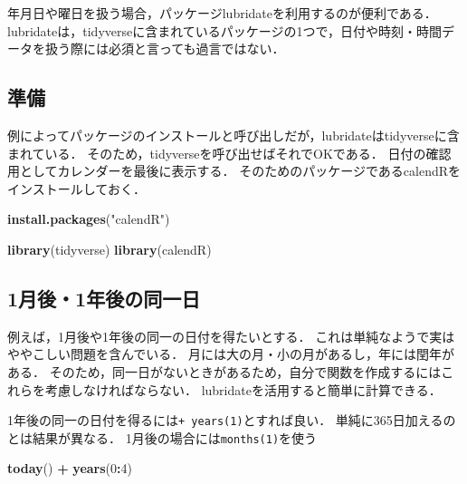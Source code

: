 \documentclass[
]{article}
\newenvironment{Shaded}{\begin{snugshade}}{\end{snugshade}}
\newcommand{\DecValTok}[1]{\textcolor[rgb]{0.00,0.00,0.81}{#1}}
\newcommand{\FunctionTok}[1]{\textcolor[rgb]{0.13,0.29,0.53}{\textbf{#1}}}
\newcommand{\NormalTok}[1]{#1}
\newcommand{\SpecialCharTok}[1]{\textcolor[rgb]{0.81,0.36,0.00}{\textbf{#1}}}
\newcommand{\StringTok}[1]{\textcolor[rgb]{0.31,0.60,0.02}{#1}}
\begin{document}
年月日や曜日を扱う場合，パッケージlubridateを利用するのが便利である．
lubridateは，tidyverseに含まれているパッケージの1つで，日付や時刻・時間データを扱う際には必須と言っても過言ではない．

\hypertarget{ux6e96ux5099-3}{%
\subsection{準備}\label{ux6e96ux5099-3}}

例によってパッケージのインストールと呼び出しだが，lubridateはtidyverseに含まれている．
そのため，tidyverseを呼び出せばそれでOKである．
日付の確認用としてカレンダーを最後に表示する．
そのためのパッケージであるcalendRをインストールしておく．

\begin{Shaded}
\begin{Highlighting}[]
\FunctionTok{install.packages}\NormalTok{(}\StringTok{"calendR"}\NormalTok{)}
\end{Highlighting}
\end{Shaded}

\begin{Shaded}
\begin{Highlighting}[]
\FunctionTok{library}\NormalTok{(tidyverse)}
\FunctionTok{library}\NormalTok{(calendR)}
\end{Highlighting}
\end{Shaded}

\hypertarget{ux6708ux5f8c1ux5e74ux5f8cux306eux540cux4e00ux65e5}{%
\subsection{1月後・1年後の同一日}\label{ux6708ux5f8c1ux5e74ux5f8cux306eux540cux4e00ux65e5}}

例えば，1月後や1年後の同一の日付を得たいとする．
これは単純なようで実はややこしい問題を含んでいる．
月には大の月・小の月があるし，年には閏年がある．
そのため，同一日がないときがあるため，自分で関数を作成するにはこれらを考慮しなければならない．
lubridateを活用すると簡単に計算できる．

1年後の同一の日付を得るには\texttt{+\ years(1)}とすれば良い．
単純に365日加えるのとは結果が異なる．
1月後の場合には\texttt{months(1)}を使う

\begin{Shaded}
\begin{Highlighting}[]
\FunctionTok{today}\NormalTok{() }\SpecialCharTok{+} \FunctionTok{years}\NormalTok{(}\DecValTok{0}\SpecialCharTok{:}\DecValTok{4}\NormalTok{)}
\end{Highlighting}
\end{Shaded}
\end{document}
